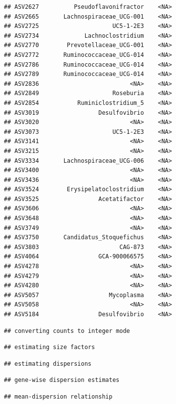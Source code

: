 \documentclass[]{article}
\begin{document}
\begin{verbatim}
## ASV2627          Pseudoflavonifractor    <NA>
## ASV2665       Lachnospiraceae_UCG-001    <NA>
## ASV2725                     UC5-1-2E3    <NA>
## ASV2734             Lachnoclostridium    <NA>
## ASV2770        Prevotellaceae_UCG-001    <NA>
## ASV2772       Ruminococcaceae_UCG-014    <NA>
## ASV2786       Ruminococcaceae_UCG-014    <NA>
## ASV2789       Ruminococcaceae_UCG-014    <NA>
## ASV2836                          <NA>    <NA>
## ASV2849                     Roseburia    <NA>
## ASV2854           Ruminiclostridium_5    <NA>
## ASV3019                 Desulfovibrio    <NA>
## ASV3020                          <NA>    <NA>
## ASV3073                     UC5-1-2E3    <NA>
## ASV3141                          <NA>    <NA>
## ASV3215                          <NA>    <NA>
## ASV3334       Lachnospiraceae_UCG-006    <NA>
## ASV3400                          <NA>    <NA>
## ASV3436                          <NA>    <NA>
## ASV3524        Erysipelatoclostridium    <NA>
## ASV3525                 Acetatifactor    <NA>
## ASV3606                          <NA>    <NA>
## ASV3648                          <NA>    <NA>
## ASV3749                          <NA>    <NA>
## ASV3750       Candidatus_Stoquefichus    <NA>
## ASV3803                       CAG-873    <NA>
## ASV4064                 GCA-900066575    <NA>
## ASV4278                          <NA>    <NA>
## ASV4279                          <NA>    <NA>
## ASV4280                          <NA>    <NA>
## ASV5057                    Mycoplasma    <NA>
## ASV5058                          <NA>    <NA>
## ASV5184                 Desulfovibrio    <NA>
\end{verbatim}

\begin{verbatim}
## converting counts to integer mode
\end{verbatim}

\begin{verbatim}
## estimating size factors
\end{verbatim}

\begin{verbatim}
## estimating dispersions
\end{verbatim}

\begin{verbatim}
## gene-wise dispersion estimates
\end{verbatim}

\begin{verbatim}
## mean-dispersion relationship
\end{verbatim}
\end{document}

